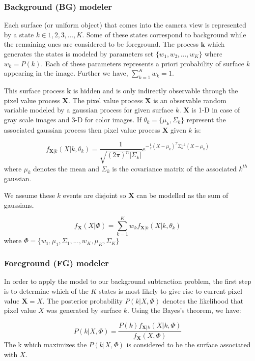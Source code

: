 \subsubsection{Background (BG) modeler}
Each surface (or uniform object) that comes into the camera view is represented by a state $k \in {1,2,3,...,K}$. Some of these states correspond to  background while the remaining ones are considered to be foreground. The process  $\mathbf{k}$ which generates the states is modeled by parameters set $\{w_1, w_2, ..., w_K\}$ where $w_k = P(k)$. Each of these parameters represents  a priori probability of surface $k$ appearing in the image. Further we have, $\sum_{k=1}^K w_k=1$. 

This surface process $\mathbf{k}$ is hidden and is only indirectly observable through the pixel value process $\mathbf{X}$. The pixel value process $\mathbf{X}$ is an observable random variable modeled by a gaussian process for given surface $k$. $\mathbf{X}$ is 1-D in case of gray scale images and 3-D for color images.  If $\theta_k= \{\mu_k, \Sigma_k \}$  represent the associated gaussian process then pixel value process $\mathbf{X}$ given $k$ is: 

$$ f_{\mathbf{X}|k}(X|k,\theta_k)=\frac{1}{\sqrt{(2\pi)^n |\Sigma_k |}}e^{-\frac{1}{2}(X-\mu_k)^T \Sigma_k^{-1} (X-\mu_k)} $$
where $\mu_k$ denotes the mean and $\Sigma_k$ is the covariance matrix of the associated $k^{th}$ gaussian. 

We assume these $k$ events are disjoint so $\mathbf{X}$ can be modelled as the sum of gaussians. 

$$ f_{\mathbf{X}}(X|\Phi)=\sum_{k=1}^K w_k f_{\mathbf{X}|k}(X|k,\theta_k)  $$
where $ \Phi = \{w_1, \mu_1, \Sigma_1,..., w_K, \mu_K, \Sigma_K \}$ 

\subsubsection{Foreground (FG) modeler}
In order to apply the model to our background subtraction problem, the first step is to determine which of the $K$ states is most likely to give rise to current pixel value $\mathbf{X}=X$. The posterior probability $P(k|X,\Phi)$ denotes the likelihood that pixel value $X$ was generated by surface $k$. Using the Bayes's theorem, we have:

$$ P(k|X,\Phi) = \frac{P(k)f_{\mathbf{X}|k}(X|k,\Phi)}{f_\mathbf{X}(X,\Phi)} $$
The k which maximizes the $P(k|X,\Phi) $ is considered to be the surface associated with $X$.

